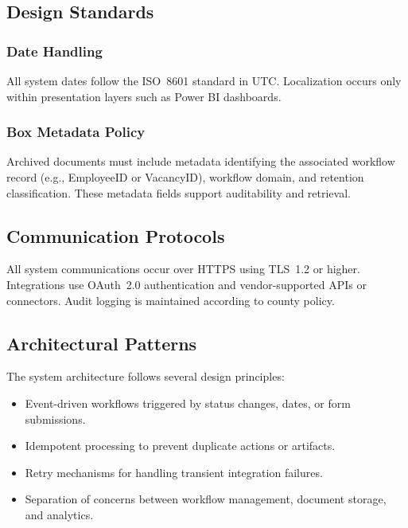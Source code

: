 \documentclass[12pt]{article}
\def\textbf#1{#1}%
\begin{document}
\subsection{Design Standards}

\subsubsection{Date Handling}

All system dates follow the ISO~8601 standard in UTC. Localization occurs only within presentation layers such as Power BI dashboards.

\subsubsection{Box Metadata Policy}

Archived documents must include metadata identifying the associated workflow record (e.g., EmployeeID or VacancyID), workflow domain, and retention classification. These metadata fields support auditability and retrieval.

\subsection{Communication Protocols}

All system communications occur over HTTPS using TLS~1.2 or higher. Integrations use OAuth~2.0 authentication and vendor-supported APIs or connectors. Audit logging is maintained according to county policy.

\subsection{Architectural Patterns}

The system architecture follows several design principles:

\begin{itemize}
    \item \textbf{Event-driven workflows} triggered by status changes, dates, or form submissions.
    \item \textbf{Idempotent processing} to prevent duplicate actions or artifacts.
    \item \textbf{Retry mechanisms} for handling transient integration failures.
    \item \textbf{Separation of concerns} between workflow management, document storage, and analytics.
\end{itemize}
\end{document}
